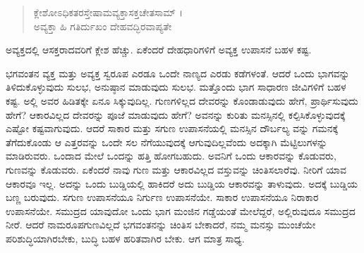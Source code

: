 \begin{verse}
ಕ್ಲೇಶೋಽಧಿಕತರಸ್ತೇಷಾಮವ್ಯಕ್ತಾಸಕ್ತಚೇತಸಾಮ್ ।\\ಅವ್ಯಕ್ತಾ ಹಿ ಗತಿರ್ದುಖಂ ದೇಹವದ್ಭಿರವಾಪ್ಯತೇ 
\end{verse}

{\small ಅವ್ಯಕ್ತದಲ್ಲಿ ಆಸಕ್ತರಾದವರಿಗೆ ಕ್ಲೇಶ ಹೆಚ್ಚು. ಏಕೆಂದರೆ ದೇಹಧಾರಿಗಳಿಗೆ ಅವ್ಯಕ್ತ ಉಪಾಸನೆ ಬಹಳ ಕಷ್ಟ.}

ಭಗವಂತನ ವ್ಯಕ್ತ ಮತ್ತು ಅವ್ಯಕ್ತ ಸ್ವರೂಪ ಎರಡೂ ಒಂದೇ ನಾಣ್ಯದ ಎರಡು ಕಡೆಗಳಂತೆ. ಆದರೆ ಒಂದು ಭಾಗವನ್ನು ತಿಳಿದುಕೊಳ್ಳುವುದು ಸುಲಭ, ಅನುಷ್ಠಾನ ಮಾಡುವುದು ಸುಲಭ. ಮತ್ತೊಂದು ಭಾಗ ಸಾಧಾರಣ ಜೀವಿಗಳಿಗೆ ಬಹಳ ಕಷ್ಟ. ಅಲ್ಲಿ ಅವರ ಹಿಡಿತಕ್ಕೇ ಏನೂ ಸಿಕ್ಕುವುದಿಲ್ಲ. ಗುಣಗಳಿಲ್ಲದ ದೇವರನ್ನು ಕೊಂಡಾಡುವುದು ಹೇಗೆ, ಪ್ರಾರ್ಥಿಸುವುದು ಹೇಗೆ? ಆಕಾರವಿಲ್ಲದ ದೇವರನ್ನು ಪೂಜೆ ಮಾಡುವುದು ಹೇಗೆ? ಅವನನ್ನು ಕುರಿತು ಮನಸ್ಸಿನಲ್ಲಿ ಕಲ್ಪಿಸಿಕೊಳ್ಳುವುದಕ್ಕೆ ಎಷ್ಟೋ ಕಷ್ಟವಾಗುವುದು. ಆದರೆ ಸಾಕಾರ ಮತ್ತು ಸಗುಣ ಉಪಾಸನೆಯಲ್ಲಿ ಮನಸ್ಸಿನ ದೌರ್ಬಲ್ಯ ವನ್ನು ಗಮನಕ್ಕೆ ತೆಗೆದುಕೊಂಡು ಆ ಎತ್ತರವನ್ನು ಒಂದೇ ಸಲ ನೆಗೆಯುವುದಕ್ಕೆ ಆಗುವುದಿಲ್ಲವೆಂದು ಅದಕ್ಕಾಗಿ ಮೆಟ್ಟಿಲುಗಳನ್ನು ಮಾಡಿರುವರು. ಒಂದಾದ ಮೇಲೆ ಒಂದನ್ನು ಹತ್ತಿ ಹೋಗಬಹುದು. ಅವನಿಗೆ ಒಂದು ಆಕಾರವನ್ನು ಕೊಡುವರು, ಗುಣವನ್ನು ಕೊಡುವರು. ಏಕೆಂದರೆ ನಾವು ಗುಣ ಮತ್ತು ಆಕಾರವಿಲ್ಲದ ವಸ್ತುವನ್ನು ಚಿಂತಿಸಲಾರೆವು. ನೀರಿಗೆ ಯಾವ ಆಕಾರವೂ ಇಲ್ಲ. ಅದನ್ನು ಒಂದು ಬುಡ್ಡಿಯಲ್ಲಿ ಹಾಕಿದರೆ ಅದು ಬುಡ್ಡಿಯ ಆಕಾರವನ್ನು ತಾಳುವುದು. ಅದಕ್ಕೆ ಬುಡ್ಡಿಯ ಬಣ್ಣ ಬರುವುದು. ಸಗುಣ ಉಪಾಸನೆಯೂ ನಿರ್ಗುಣ ಉಪಾಸನೆಯೇ. ಸಾಕಾರ ಉಪಾಸನೆಯೂ ನಿರಾಕಾರ ಉಪಾಸನೆಯೇ. ಸಮುದ್ರದ ಯಾವುದೋ ಒಂದು ಭಾಗ ಮಂಜಿನ ಗಡ್ಡೆಯಂತೆ ಮೇಲೆದ್ದರೆ, ಅಲ್ಲಿರುವುದೂ ಸಮುದ್ರದ ನೀರೆ. ಆದರೆ ನಾಮರೂಪಗುಣವಿಲ್ಲದೆ ಭಗವಂತನನ್ನು ಚಿಂತಿಸ ಬೇಕಾದರೆ, ನಮ್ಮ ಮನಸ್ಸು ಮುಂಚೆಯೇ ಪರಿಶುದ್ಧಿಯಾಗಿರಬೇಕು, ಬುದ್ಧಿ ಬಹಳ ಹರಿತವಾಗಿರ ಬೇಕು. ಆಗ ಮಾತ್ರ ಸಾಧ್ಯ.

